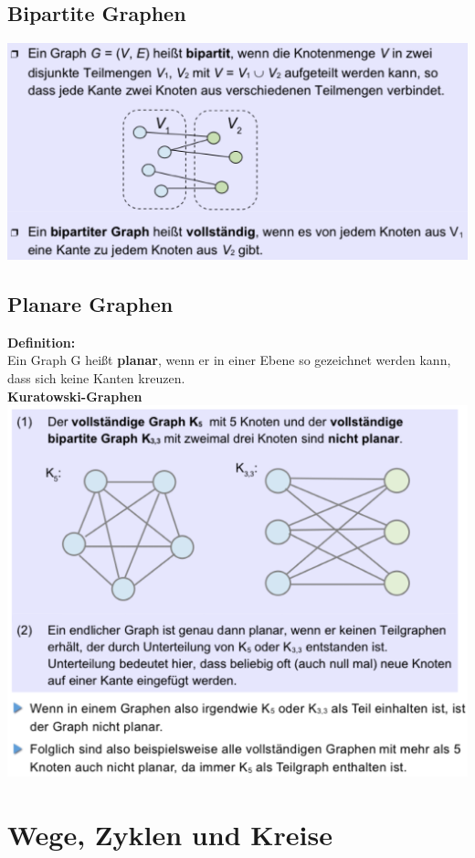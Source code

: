 \documentclass{scrreprt}
\begin{document}
\subsection{Bipartite Graphen}
\includegraphics[width=1\textwidth]{"graphics/bipartit"}
\pagebreak
\subsection{Planare Graphen}
\textbf{Definition:}
\\Ein Graph G heißt \textbf{planar}, wenn er in einer Ebene so gezeichnet werden kann, dass sich keine Kanten kreuzen.
\\\textbf{Kuratowski-Graphen}
\\\includegraphics[width=1\textwidth]{"graphics/kuratowski"}
\pagebreak
\section{Wege, Zyklen und Kreise}
\end{document}
